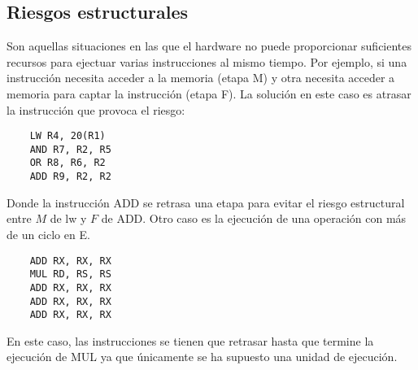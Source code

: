 \subsection{Riesgos estructurales}
Son aquellas situaciones en las que el hardware no puede proporcionar suficientes recursos para ejectuar varias instrucciones
al mismo tiempo. Por ejemplo, si una instrucción necesita acceder a la memoria (etapa M) y otra necesita acceder a memoria para captar la instrucción (etapa F).
La solución en este caso es atrasar la instrucción que provoca el riesgo:
\begin{center}
    \begin{minipage}{0.3\textwidth}
        \begin{verbatim}
    LW R4, 20(R1)
    AND R7, R2, R5
    OR R8, R6, R2
    ADD R9, R2, R2
        \end{verbatim}
    \end{minipage}
    \begin{minipage}{0.3\textwidth}
        
        
    \end{minipage}
    \begin{minipage}{0.35\textwidth}
        
    \end{minipage}
\end{center}
Donde la instrucción ADD se retrasa una etapa para evitar el riesgo estructural entre $M$ de lw y $F$ de ADD.
Otro caso es la ejecución de una operación con más de un ciclo en E.
\begin{center}
    \begin{minipage}{0.3\textwidth}
        \begin{verbatim}
    ADD RX, RX, RX
    MUL RD, RS, RS
    ADD RX, RX, RX
    ADD RX, RX, RX
    ADD RX, RX, RX
        \end{verbatim}
    \end{minipage}
    \begin{minipage}{0.3\textwidth}
        

    \end{minipage}
    \begin{minipage}{0.35\textwidth}
        
    \end{minipage}
\end{center}
En este caso, las instrucciones se tienen que retrasar hasta que termine la ejecución de MUL ya que únicamente se ha supuesto una unidad de ejecución.
